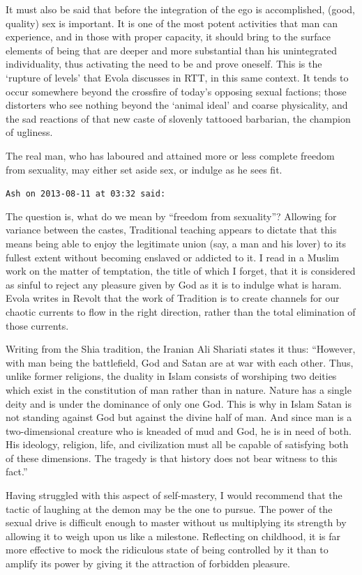 \begin{footnotesize}
\begin{sffamily}
It must also be said that before the integration of the ego is accomplished, (good, quality) sex is important. It is one of the most potent activities that man can experience, and in those with proper capacity, it should bring to the surface elements of being that are deeper and more substantial than his unintegrated individuality, thus activating the need to be and prove oneself. This is the `rupture of levels' that Evola discusses in RTT, in this same context. It tends to occur somewhere beyond the crossfire of today's opposing sexual factions; those distorters who see nothing beyond the `animal ideal' and coarse physicality, and the sad reactions of that new caste of slovenly tattooed barbarian, the champion of ugliness.

The real man, who has laboured and attained more or less complete freedom from sexuality, may either set aside sex, or indulge as he sees fit.

\hfill

\texttt{Ash on 2013-08-11 at 03:32 said:}

The question is, what do we mean by ``freedom from sexuality''? Allowing for variance between the castes, Traditional teaching appears to dictate that this means being able to enjoy the legitimate union (say, a man and his lover) to its fullest extent without becoming enslaved or addicted to it. I read in a Muslim work on the matter of temptation, the title of which I forget, that it is considered as sinful to reject any pleasure given by God as it is to indulge what is haram. Evola writes in Revolt that the work of Tradition is to create channels for our chaotic currents to flow in the right direction, rather than the total elimination of those currents.

Writing from the Shia tradition, the Iranian Ali Shariati states it thus: ``However, with man being the battlefield, God and Satan are at war with each other. Thus, unlike former religions, the duality in Islam consists of worshiping two deities which exist in the constitution of man rather than in nature. Nature has a single deity and is under the dominance of only one God. This is why in Islam Satan is not standing against God but against the divine half of man. And since man is a two-dimensional creature who is kneaded of mud and God, he is in need of both. His ideology, religion, life, and civilization must all be capable of satisfying both of these dimensions. The tragedy is that history does not bear witness to this fact.''

Having struggled with this aspect of self-mastery, I would recommend that the tactic of laughing at the demon may be the one to pursue. The power of the sexual drive is difficult enough to master without us multiplying its strength by allowing it to weigh upon us like a milestone. Reflecting on childhood, it is far more effective to mock the ridiculous state of being controlled by it than to amplify its power by giving it the attraction of forbidden pleasure.


\end{sffamily}
\end{footnotesize}
